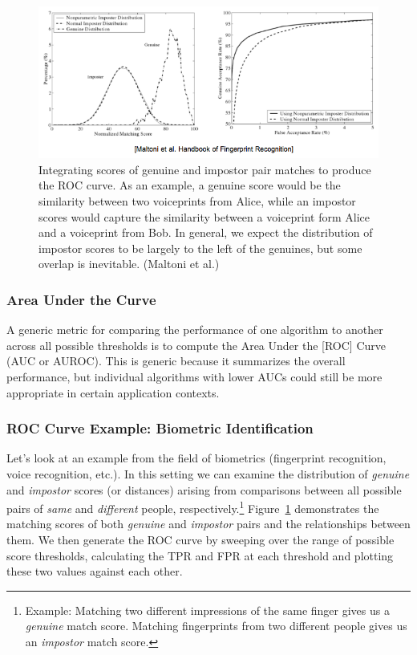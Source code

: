 \documentclass[a4paper]{article}
\begin{document}
\begin{figure}
\centering
\includegraphics[width=1.0\textwidth]{MaltoniROC.png}
\caption{\label{maltoni_roc}Integrating scores of genuine and impostor pair matches to produce the ROC curve.  As an example, a genuine score would be the similarity between two voiceprints from Alice, while an impostor scores would capture the similarity between a voiceprint form Alice and a voiceprint from Bob.  In general, we expect the distribution of impostor scores to be largely to the left of the genuines, but some overlap is inevitable. (Maltoni et al.)}
\end{figure}

\subsubsection{Area Under the Curve}
A generic metric for comparing the performance of one algorithm to another across all possible thresholds is to compute the Area Under the [ROC] Curve (AUC or AUROC).  This is generic because it summarizes the overall performance, but individual algorithms with lower AUCs could still be more appropriate in certain application contexts.

\subsubsection{ROC Curve Example: Biometric Identification}
Let's look at an example from the field of biometrics (fingerprint recognition, voice recognition, etc.). In this setting we can examine the distribution of \textit{genuine} and \textit{impostor} scores (or distances) arising from comparisons between all possible pairs of \emph{same} and \emph{different} people, respectively.\footnote{Example: Matching two different impressions of the same finger gives us a \emph{genuine} match score. Matching fingerprints from two different people gives us an \emph{impostor} match score.} Figure~\ref{maltoni_roc} demonstrates the matching scores of both \textit{genuine} and \textit{impostor} pairs and the relationships between them. We then generate the ROC curve by sweeping over the range of possible score thresholds, calculating the TPR and FPR at each threshold and plotting these two values against each other.
\end{document}
